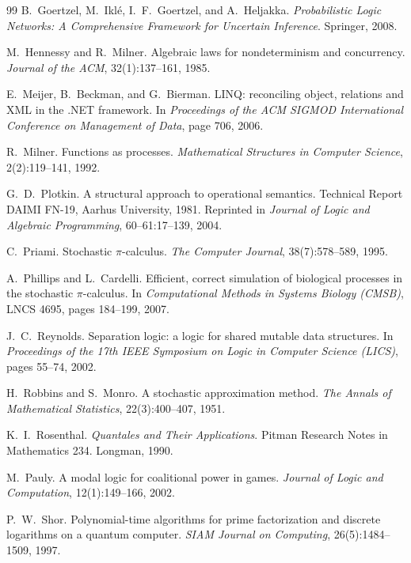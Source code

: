 \documentclass[11pt]{article}
\theoremstyle{definition}
\theoremstyle{plain}
\theoremstyle{remark}
\begin{document}
\begin{thebibliography}{99}
B.~Goertzel, M.~Ikl\'{e}, I.~F.~Goertzel, and A.~Heljakka.
\newblock \emph{Probabilistic Logic Networks: A Comprehensive Framework for
Uncertain Inference}.
\newblock Springer, 2008.

M.~Hennessy and R.~Milner.
\newblock Algebraic laws for nondeterminism and concurrency.
\newblock \emph{Journal of the ACM}, 32(1):137--161, 1985.

E.~Meijer, B.~Beckman, and G.~Bierman.
\newblock LINQ: reconciling object, relations and XML in the .NET framework.
\newblock In \emph{Proceedings of the ACM SIGMOD International Conference on
Management of Data}, page 706, 2006.

R.~Milner.
\newblock Functions as processes.
\newblock \emph{Mathematical Structures in Computer Science}, 2(2):119--141,
1992.

G.~D.~Plotkin.
\newblock A structural approach to operational semantics.
\newblock Technical Report DAIMI FN-19, Aarhus University, 1981.
\newblock Reprinted in \emph{Journal of Logic and Algebraic Programming},
60--61:17--139, 2004.

C.~Priami.
\newblock Stochastic $\pi$-calculus.
\newblock \emph{The Computer Journal}, 38(7):578--589, 1995.

A.~Phillips and L.~Cardelli.
\newblock Efficient, correct simulation of biological processes in the
stochastic $\pi$-calculus.
\newblock In \emph{Computational Methods in Systems Biology (CMSB)}, LNCS 4695,
pages 184--199, 2007.

J.~C.~Reynolds.
\newblock Separation logic: a logic for shared mutable data structures.
\newblock In \emph{Proceedings of the 17th IEEE Symposium on Logic in Computer
Science (LICS)}, pages 55--74, 2002.

H.~Robbins and S.~Monro.
\newblock A stochastic approximation method.
\newblock \emph{The Annals of Mathematical Statistics}, 22(3):400--407, 1951.

K.~I.~Rosenthal.
\newblock \emph{Quantales and Their Applications}.
\newblock Pitman Research Notes in Mathematics 234. Longman, 1990.

M.~Pauly.
\newblock A modal logic for coalitional power in games.
\newblock \emph{Journal of Logic and Computation}, 12(1):149--166, 2002.

P.~W.~Shor.
\newblock Polynomial-time algorithms for prime factorization and discrete
logarithms on a quantum computer.
\newblock \emph{SIAM Journal on Computing}, 26(5):1484--1509, 1997.


\end{thebibliography}
\end{document}
